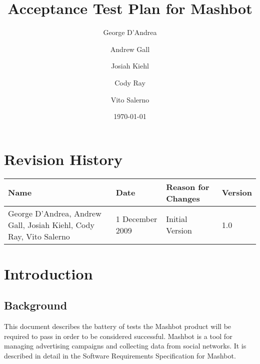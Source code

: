 \documentclass{article}
\begin{document}
\title{Acceptance Test Plan for Mashbot} 
\author{George D'Andrea \and Andrew Gall \and Josiah Kiehl \and
  Cody Ray \and Vito Salerno}
\date{\today}
\begin{titlepage}
\maketitle
\end{titlepage}

\section*{Revision History}
\begin{tabular}{|p{2in}|l|l|l|}
  \hline
  \textbf{Name} & \textbf{Date} & \textbf{Reason for Changes} & \textbf{Version} \\
  \hline \hline
  George D'Andrea, Andrew Gall, Josiah Kiehl, Cody Ray, Vito
  Salerno & 1 December 2009 & Initial Version & 1.0 \\
  \hline
\end{tabular}

\clearpage
\tableofcontents
\clearpage

\section{Introduction}

\subsection{Background}

This document describes the battery of tests the Mashbot product will
be required to pass in order to be considered successful. Mashbot is a
tool for managing advertising campaigns and collecting data from
social networks. It is described in detail in the Software
Requirements Specification for Mashbot.
\end{document}
